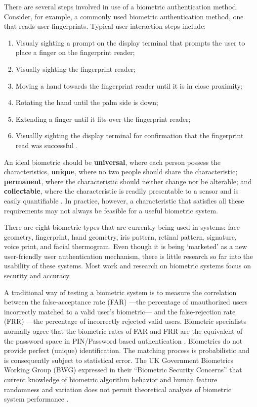 \documentclass{article}
\begin{document}
There are several steps involved in use of a biometric authentication method. Consider, for example, a commonly used biometric authentication method, one that reads user fingerprints. Typical user interaction steps include:
\begin{enumerate}
\item Visualy sighting a prompt on the display terminal that prompts the user to place a finger on the fingerprint reader;
\item Visually sighting the fingerprint reader;
\item Moving a hand towards the fingerprint reader until it is in close proximity;
\item Rotating the hand until the palm side is down;
\item Extending a finger until it fits over the fingerprint reader;
\item Visuallly sighting the display terminal for confirmation that the fingerprint read was successful \cite{schultz2001usability}.
\end{enumerate}

An ideal biometric should be \textbf{universal}, where each person possess the characteristics, \textbf{unique}, where no two people should share the characteristic; \textbf{permanent}, where the characteristic should neither change nor be alterable; and \textbf{collectable}, where the characteristic is readily presentable to a sensor and is easily quantifiable \cite{jain2000biometric}. In practice, however, a characteristic that satisfies all these requirements may not always be feasible for a useful biometric system.

There are eight biometric types that are currently being used in systems: face geometry, fingerprint, hand geometry, iris pattern, retinal pattern, signature, voice print, and facial thermogram. Even though it is being `marketed' as a new user-friendly user authentication mechanism, there is little research so far into the usability of these systems. Most work and research on biometric systems focus on security and accuracy. 

A traditional way of testing a biometric system is to measure the correlation between the false-acceptance rate (FAR) ---the percentage of unauthorized users incorrectly matched to a valid user's biometric--- and the false-rejection rate (FRR) ---the percentage of incorrectly rejected valid users. Biometric specialists normally agree that the biometric rates of FAR and FRR are the equivalent of the password space in PIN/Password based authentication \cite{biometrics2003biometrics}. Biometrics do not provide perfect (unique) identification. The matching process is probabilistic and is consequently subject to statistical error.    The UK Government Biometrics Working Group (BWG) expressed in their “Biometric Security Concerns” that current knowledge of biometric algorithm behavior and human feature randomness and variation does not permit theoretical analysis of biometric system performance \cite{biometrics2003biometrics}.
\end{document}
